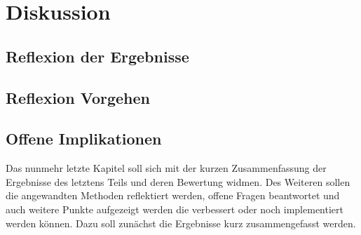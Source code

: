 \documentclass[12pt, a4paper]{scrbook}
\begin{document}
\let\cleardoublepage\relax
\chapter{Diskussion}
\section{Reflexion der Ergebnisse}
\section{Reflexion Vorgehen}
\section{Offene Implikationen}
Das nunmehr letzte Kapitel soll sich mit der kurzen Zusammenfassung der Ergebnisse des letztens Teils und deren Bewertung widmen. Des Weiteren sollen die angewandten Methoden reflektiert werden, offene Fragen beantwortet und auch weitere Punkte aufgezeigt werden die verbessert oder noch implementiert werden können. Dazu soll zunächst die Ergebnisse kurz zusammengefasst werden.

\let\cleardoublepage\relax
\pagestyle{empty}
\newpage
\pagestyle{empty}
\printbibheading
\printbibliography[type=book,heading=subbibliography,title={Literaturquellen}]
\printbibliography[type=misc,heading=subbibliography,title={Online Quellen}]
\pagestyle{empty}
\newpage
\pagestyle{empty}
\end{document}

